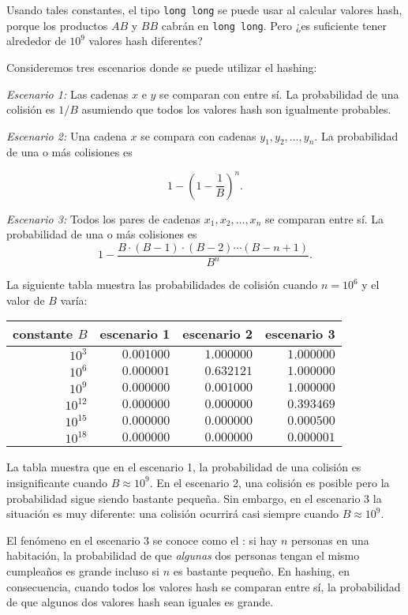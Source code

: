 Usando tales constantes,
el tipo \texttt{long long} se puede usar
al calcular valores hash,
porque los productos $AB$ y $BB$ cabrán en \texttt{long long}.
Pero ¿es suficiente tener alrededor de $10^9$ valores hash diferentes?

Consideremos tres escenarios donde se puede utilizar el hashing:

\textit{Escenario 1:} Las cadenas $x$ e $y$ se comparan con
entre sí.
La probabilidad de una colisión es $1/B$ asumiendo que
todos los valores hash son igualmente probables.

\textit{Escenario 2:} Una cadena $x$ se compara con cadenas
$y_1,y_2,\ldots,y_n$.
La probabilidad de una o más colisiones es

\[1-(1-\frac{1}{B})^n.\]

\textit{Escenario 3:} Todos los pares de cadenas $x_1,x_2,\ldots,x_n$
se comparan entre sí.
La probabilidad de una o más colisiones es
\[ 1 - \frac{B \cdot (B-1) \cdot (B-2) \cdots (B-n+1)}{B^n}.\]

La siguiente tabla muestra las probabilidades de colisión
cuando $n=10^6$ y el valor de $B$ varía:

\begin{center}
\begin{tabular}{rrrr}
constante $B$ & escenario 1 & escenario 2 & escenario 3 \\
\hline
$10^3$ & $0.001000$ & $1.000000$ & $1.000000$ \\
$10^6$ & $0.000001$ & $0.632121$ & $1.000000$ \\
$10^9$ & $0.000000$ & $0.001000$ & $1.000000$ \\
$10^{12}$ & $0.000000$ & $0.000000$ & $0.393469$ \\
$10^{15}$ & $0.000000$ & $0.000000$ & $0.000500$ \\
$10^{18}$ & $0.000000$ & $0.000000$ & $0.000001$ \\
\end{tabular}
\end{center}

La tabla muestra que en el escenario 1,
la probabilidad de una colisión es insignificante
cuando $B \approx 10^9$.
En el escenario 2, una colisión es posible pero la
probabilidad sigue siendo bastante pequeña.
Sin embargo, en el escenario 3 la situación es muy diferente:
una colisión ocurrirá casi siempre cuando
$B \approx 10^9$.


El fenómeno en el escenario 3 se conoce como el
: si hay $n$ personas
en una habitación, la probabilidad de que \emph{algunas} dos personas
tengan el mismo cumpleaños es grande incluso si $n$ es bastante pequeño.
En hashing, en consecuencia, cuando todos los valores hash se comparan
entre sí, la probabilidad de que algunos dos
valores hash sean iguales es grande.

